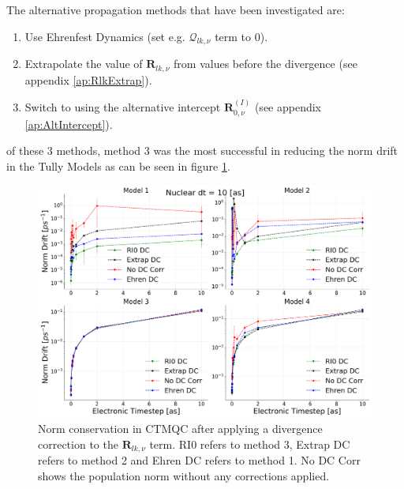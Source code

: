 \noindent The alternative propagation methods that have been investigated are:
\begin{enumerate}
	\item Use Ehrenfest Dynamics (set e.g. $\mathcal{Q}_{lk, \nu}$ term to 0).
	\item Extrapolate the value of $\mathbf{R}_{lk, \nu}$ from values before the divergence (see appendix \ref{ap:RlkExtrap}).
	\item Switch to using the alternative intercept $\mathbf{R}_{0, \nu}^{(I)}$ (see appendix \ref{ap:AltIntercept}).
\end{enumerate}
of these 3 methods, method 3 was the most successful in reducing the norm drift in the Tully Models as can be seen in figure \ref{fig:NormConsCorr}.
\begin{figure}[ht]
	\includegraphics[width=\textwidth]{img/CTMQC/TullyModels/CTMQC_Norm_Conservation_wCorr.png}
	\caption{\label{fig:NormConsCorr}Norm conservation in CTMQC after applying a divergence correction to the $\mathbf{R}_{lk, \nu}$ term. RI0 refers to method 3, Extrap DC refers to method 2 and Ehren DC refers to method 1. No DC Corr shows the population norm without any corrections applied.}
\end{figure}
\\
